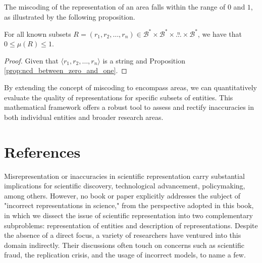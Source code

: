 The miscoding of the representation of an area falls within the range of $0$ and $1$, as illustrated by the following proposition.

\begin{proposition}
\label{prop:inaccuracy:inaccuracy:range}
For all known subsets $R = \left( r_1, r_2, \ldots, r_n \right) \in \mathcal{B}^\ast \times \mathcal{B}^\ast \times \overset{n} \ldots \times \mathcal{B}^\ast$, we have that $0 \leq \mu(R) \leq 1$.
\end{proposition}
\begin{proof}
Given that $\langle r_1, r_2, \ldots, r_n \rangle$ is a string and Proposition \ref{prop:ncd_between_zero_and_one}.
\end{proof}

By extending the concept of miscoding to encompass areas, we can quantitatively evaluate the quality of representations for specific subsets of entities. This mathematical framework offers a robust tool to assess and rectify inaccuracies in both individual entities and broader research areas.


%
%

\section*{References}

Misrepresentation or inaccuracies in scientific representation carry substantial implications for scientific discovery, technological advancement, policymaking, among others. However, no book or paper explicitly addresses the subject of "incorrect representations in science," from the perspective adopted in this book, in which we dissect the issue of scientific representation into two complementary subproblems: representation of entities and description of representations. Despite the absence of a direct focus, a variety of researchers have ventured into this domain indirectly. Their discussions often touch on concerns such as scientific fraud, the replication crisis, and the usage of incorrect models, to name a few. 

